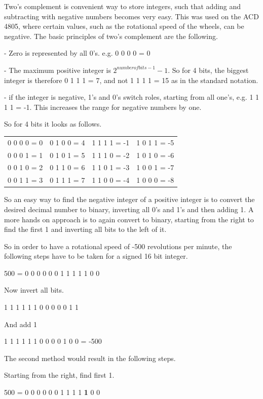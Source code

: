 Two's complement is convenient way to store integers, such that adding and subtracting with negative numbers becomes very easy. This was used on the ACD 4805, where certain values, such as the rotational speed of the wheels, can be negative. 
The basic principles of two's complement are the following.

- Zero is represented by all 0's. 
e.g. 0 0 0 0 = 0

- The maximum positive integer is $ 2^{number of bits-1}-1 $.
So for 4 bits, the biggest integer is therefore 0 1 1 1 = 7, and not 1 1 1 1 = 15 as in the standard notation.

- if the integer is negative, 1's and 0's switch roles, starting from all one's, e.g. 1 1 1 1 = -1. This increases the range for negative numbers by one.

So for 4 bits it looks as follows.

\begin{tabular}{llll}
	0 0 0 0 = 0 & 0 1 0 0 = 4 & 1 1 1 1 = -1 & 1 0 1 1 = -5\\
	0 0 0 1 = 1 & 0 1 0 1 = 5 & 1 1 1 0 = -2 & 1 0 1 0 = -6\\
	0 0 1 0 = 2 & 0 1 1 0 = 6 & 1 1 0 1 = -3 & 1 0 0 1 = -7\\
	0 0 1 1 = 3 & 0 1 1 1 = 7 & 1 1 0 0 = -4 & 1 0 0 0 = -8
\end{tabular}

So an easy way to find the negative integer of a positive integer is to convert the desired decimal number to binary, inverting all 0's and 1's and then adding 1. A more hands on approach is to again convert to binary, starting from the right to find the first 1 and inverting all bits to the left of it.

So in order to have a rotational speed of -500 revolutions per minute, the following steps have to be taken for a signed 16 bit integer.

500 = 0 0 0 0  0 0 1  1 1 1  1 0 0

Now invert all bits.

1 1 1 1  1 1 0  0 0 0  0 1 1

And add 1

1 1 1 1  1 1 0  0 0 0  1 0 0 = -500

The second method would result in the following steps.

Starting from the right, find first 1.

500 = 0 0 0 0  0 0 1  1 1 1  \textbf{1} 0 0


